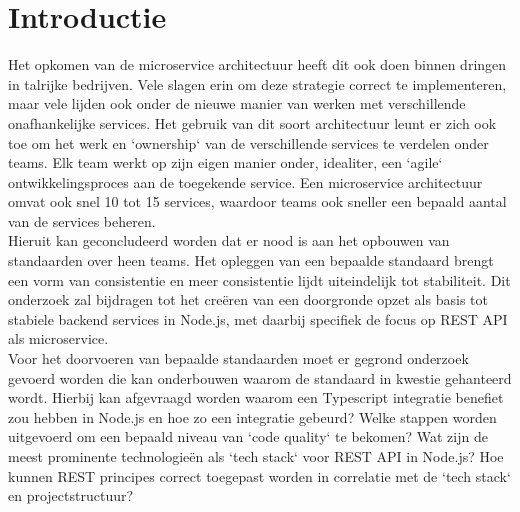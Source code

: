 
\section{Introductie} %
\label{sec:introductie}


Het opkomen van de microservice architectuur heeft dit ook doen binnen dringen in talrijke bedrijven. Vele slagen erin om deze strategie correct te implementeren, maar vele lijden ook onder de nieuwe manier van werken met verschillende onafhankelijke services.
Het gebruik van dit soort architectuur leunt er zich ook toe om het werk en `ownership` van de verschillende services te verdelen onder teams. Elk team werkt op zijn eigen manier onder, idealiter, een `agile` ontwikkelingsproces aan de toegekende service. Een microservice architectuur omvat ook snel 10 tot 15 services, waardoor teams ook sneller een bepaald aantal van de services beheren. \\
Hieruit kan geconcludeerd worden dat er nood is aan het opbouwen van standaarden over heen teams. Het opleggen van een bepaalde standaard brengt een vorm van consistentie en meer consistentie lijdt uiteindelijk tot stabiliteit. Dit onderzoek zal bijdragen tot het creëren van een doorgronde opzet als basis tot stabiele backend services in Node.js, met daarbij specifiek de focus op REST API als microservice. \\
Voor het doorvoeren van bepaalde standaarden moet er gegrond onderzoek gevoerd worden die kan onderbouwen waarom de standaard in kwestie gehanteerd wordt. Hierbij kan afgevraagd worden waarom een Typescript integratie benefiet zou hebben in Node.js en hoe zo een integratie gebeurd? Welke stappen worden uitgevoerd om een bepaald niveau van `code quality` te bekomen? Wat zijn de meest prominente technologieën als `tech stack` voor REST API in Node.js? Hoe kunnen REST principes correct toegepast worden in correlatie met de `tech stack` en projectstructuur?

